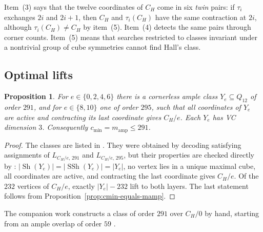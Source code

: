 \documentclass[11pt]{article}
\numberwithin{equation}{section}
\newtheorem{proposition}[theorem]{Proposition}
\theoremstyle{definition}
\theoremstyle{remark}
\newcommand{\Sh}{\operatorname{Sh}}
\newcommand{\SSh}{\operatorname{SSh}}
\newcommand{\cmin}{c_{\min}}
\newcommand{\mamp}{m_{\mathrm{amp}}}
\begin{document}
Item~(3) says that the twelve coordinates of \(C_H\) come in six
\emph{twin} pairs: if \(\tau_i\) exchanges \(2i\) and \(2i+1\), then \(C_H\) and
\(\tau_i(C_H)\) have the same contraction at \(2i\), although
\(\tau_i(C_H)\ne C_H\) by item~(5).  Item~(4) detects the same pairs through
corner counts.  Item~(5) means that searches restricted to classes invariant
under a nontrivial group of cube symmetries cannot find Hall's class.

\subsection{Optimal lifts}

\begin{proposition}
\label{prop:291}
For \(e\in\{0,2,4,6\}\) there is a cornerless ample class
\(Y_e\subseteq Q_{12}\) of order \(291\), and for \(e\in\{8,10\}\) one of order
\(295\), such that all coordinates of \(Y_e\) are active and contracting its
last coordinate gives \(C_H/e\).  Each \(Y_e\) has VC dimension \(3\).
Consequently \(\cmin=\mamp\le291\).
\end{proposition}

\begin{proof}
The classes are listed in .  They were obtained
by decoding satisfying assignments of \(L_{C_H/e,\,291}\) and
\(L_{C_H/e,\,295}\), but their properties are checked directly by
: \(|\Sh(Y_e)|=|\SSh(Y_e)|=|Y_e|\),
no vertex lies in a unique maximal cube, all coordinates are active, and
contracting the last coordinate gives \(C_H/e\).  Of the \(232\) vertices of
\(C_H/e\), exactly \(|Y_e|-232\) lift to both layers.  The last statement
follows from Proposition~\ref{prop:cmin-equals-mamp}.
\end{proof}

The companion work constructs a class of order \(291\) over \(C_H/0\) by
hand, starting from an ample overlap of order \(59\)
\cite{BousquetDampReader}.
\end{document}
